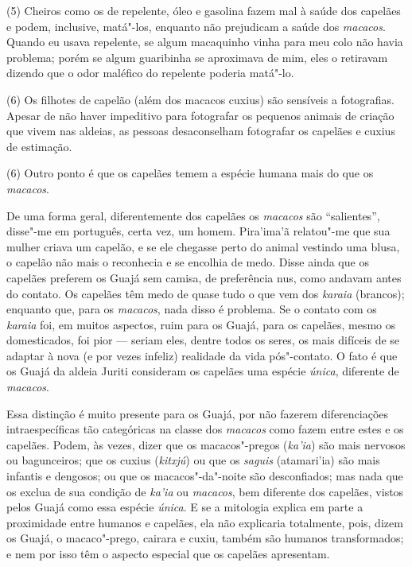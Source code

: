 (5) Cheiros como os de repelente, óleo e gasolina fazem mal à saúde dos
capelães e podem, inclusive, matá"-los, enquanto não prejudicam a saúde
dos \emph{macacos}. Quando eu usava repelente, se algum macaquinho vinha
para meu colo não havia problema; porém se algum guaribinha se
aproximava de mim, eles o retiravam dizendo que o odor maléfico do
repelente poderia matá"-lo.

(6) Os filhotes de capelão (além dos macacos cuxius) são sensíveis a
fotografias. Apesar de não haver impeditivo para fotografar os pequenos
animais de criação que vivem nas aldeias, as pessoas desaconselham
fotografar os capelães e cuxius de estimação.

(6) Outro ponto é que os capelães temem a espécie humana mais do que os
\emph{macacos}.

De uma forma geral, diferentemente dos capelães os \emph{macacos} são
``salientes'', disse"-me em português, certa vez, um homem. Pira'ima'ã
relatou"-me que sua mulher criava um capelão, e se ele chegasse perto do
animal vestindo uma blusa, o capelão não mais o reconhecia e se encolhia
de medo. Disse ainda que os capelães preferem os Guajá sem camisa, de
preferência nus, como andavam antes do contato. Os capelães têm medo de
quase tudo o que vem dos \emph{karaia} (brancos); enquanto que, para os
\emph{macacos}, nada disso é problema. Se o contato com os \emph{karaia}
foi, em muitos aspectos, ruim para os Guajá, para os capelães, mesmo os
domesticados, foi pior --- seriam eles, dentre todos os seres, os mais
difíceis de se adaptar à nova (e por vezes infeliz) realidade da vida
pós"-contato. O fato é que os Guajá da aldeia Juriti consideram os
capelães uma espécie \emph{única}, diferente de \emph{macacos}.

Essa distinção é muito presente para os Guajá, por não fazerem
diferenciações intraespecíficas tão categóricas na classe dos
\emph{macacos} como fazem entre estes e os capelães. Podem, às vezes,
dizer que os macacos"-pregos (\emph{ka'ia}) são mais nervosos ou
bagunceiros; que os cuxius (\emph{kitxjú}) ou que os \emph{saguis}
(atamari'ia) são mais infantis e dengosos; ou que os macacos"-da"-noite
são desconfiados; mas nada que os exclua de sua condição de \emph{ka'ia}
ou \emph{macacos}, bem diferente dos capelães, vistos pelos Guajá como
essa espécie \emph{única}. E se a mitologia explica em parte a
proximidade entre humanos e capelães, ela não explicaria totalmente,
pois, dizem os Guajá, o macaco"-prego, cairara e cuxiu, também são
humanos transformados; e nem por isso têm o aspecto especial que os
capelães apresentam.

